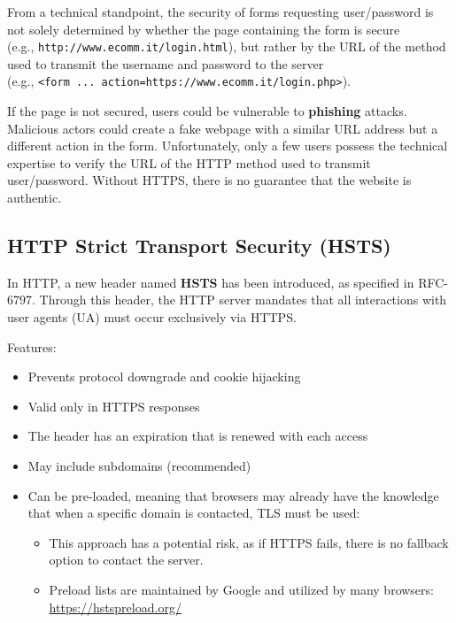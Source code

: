 From a technical standpoint, the security of forms requesting user/password is not solely determined by whether the page containing the form is secure \\
(e.g., \texttt{http://www.ecomm.it/login.html}),
but rather by the URL of the method used to transmit the username and password to the server \\
(e.g., \texttt{<form ... action=http\emph{s}://www.ecomm.it/login.php>}).

If the page is not secured, users could be vulnerable to \textbf{phishing} attacks. Malicious actors could create a fake webpage with a similar URL address but a different action in the form. Unfortunately, only a few users possess the technical expertise to verify the URL of the HTTP method used to transmit user/password. Without HTTPS, there is no guarantee that the website is authentic.


\subsection{HTTP Strict Transport Security (HSTS)}

In HTTP, a new header named \textbf{HSTS} has been introduced, as specified in RFC-6797. Through this header, the HTTP server mandates that all interactions with user agents (UA) must occur exclusively via HTTPS.

Features:
\begin{itemize}
    \item Prevents protocol downgrade and cookie hijacking
    \item Valid only in HTTPS responses
    \item The header has an expiration that is renewed with each access
    \item May include subdomains (recommended)
    \item Can be pre-loaded, meaning that browsers may already have the knowledge that when a specific domain is contacted, TLS must be used:
          \begin{itemize}
              \item This approach has a potential risk, as if HTTPS fails, there is no fallback option to contact the server.
              \item Preload lists are maintained by Google and utilized by many browsers: \url{https://hstspreload.org/}
          \end{itemize}
\end{itemize}



